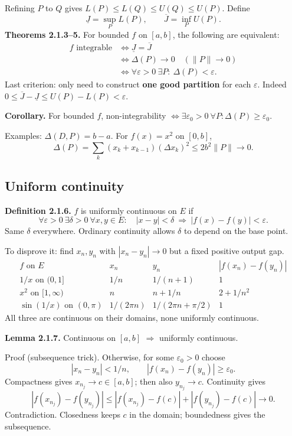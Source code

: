 \documentclass[11pt,letterpaper]{article}
\begin{document}
Refining \(P\) to \(Q\) gives \(L(P)\le L(Q)\le U(Q)\le U(P)\). Define
\[
\underline J=\sup_P L(P),\qquad \overline J=\inf_P U(P).
\] \textbf{Theorems 2.1.3--5.} For bounded \(f\) on \([a,b]\), the
following are equivalent: \[
\begin{aligned}
f\text{ integrable}
&\iff \underline J=\overline J\\
&\iff \Delta(P)\to0\quad(\|P\|\to0)\\
&\iff \forall\varepsilon>0\ \exists P:\ \Delta(P)<\varepsilon.
\end{aligned}
\] Last criterion: only need to construct \textbf{one good partition}
for each \(\varepsilon\). Indeed
\(0\le\overline J-\underline J\le U(P)-L(P)<\varepsilon\).

\newpage

\textbf{Corollary.} For bounded \(f\), non-integrability
\(\iff\exists\varepsilon_0>0\ \forall P:\Delta(P)\ge\varepsilon_0\).

Examples: \(\Delta(D,P)=b-a\). For \(f(x)=x^2\) on \([0,b]\), \[
\Delta(P)=\sum_k(x_k+x_{k-1})(\Delta x_k)^2
\le2b^2\|P\|\to0.
\]

\subsection{Uniform continuity}\label{uniform-continuity}

\textbf{Definition 2.1.6.} \(f\) is uniformly continuous on \(E\) if \[
\forall\varepsilon>0\ \exists\delta>0\ \forall x,y\in E:
\quad |x-y|<\delta\ \Rightarrow\ |f(x)-f(y)|<\varepsilon.
\] Same \(\delta\) everywhere. Ordinary continuity allows \(\delta\) to
depend on the base point.

To disprove it: find \(x_n,y_n\) with \(|x_n-y_n|\to0\) but a fixed
positive output gap. \[
\begin{array}{c|c|c|c}
f\text{ on }E&x_n&y_n&|f(x_n)-f(y_n)|\\\hline
1/x\text{ on }(0,1]&1/n&1/(n+1)&1\\[4pt]
x^2\text{ on }[1,\infty)&n&n+1/n&2+1/n^2\\[4pt]
\sin(1/x)\text{ on }(0,\pi)&1/(2\pi n)&1/(2\pi n+\pi/2)&1
\end{array}
\] All three are continuous on their domains, none uniformly continuous.

\textbf{Lemma 2.1.7.} Continuous on \([a,b]\) \(\Rightarrow\) uniformly
continuous.

Proof (subsequence trick). Otherwise, for some \(\varepsilon_0>0\)
choose \[
|x_n-y_n|<1/n,\qquad |f(x_n)-f(y_n)|\ge\varepsilon_0.
\] Compactness gives \(x_{n_j}\to c\in[a,b]\); then also
\(y_{n_j}\to c\). Continuity gives \[
|f(x_{n_j})-f(y_{n_j})|
\le |f(x_{n_j})-f(c)|+|f(y_{n_j})-f(c)|\to0.
\] Contradiction. Closedness keeps \(c\) in the domain; boundedness
gives the subsequence.
\end{document}
